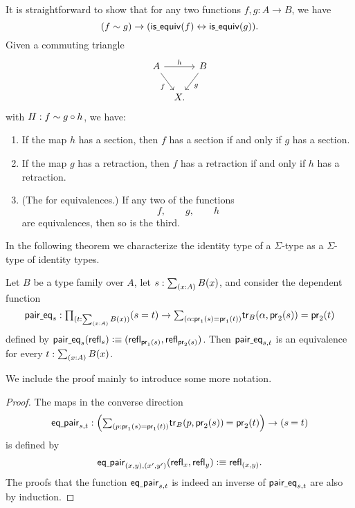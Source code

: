 It is straightforward to show that for any two functions $f,g:A\to B$, we have
\begin{equation*}
(f\sim g)\to (\mathsf{is\underline{\ }{}equiv}(f)\leftrightarrow\mathsf{is\underline{\ }{}equiv}(g)).
\end{equation*}
Given a commuting triangle
\begin{equation*}
\begin{tikzcd}[column sep=tiny]
A \arrow[rr,"h"] \arrow[dr,swap,"f"] & & B \arrow[dl,"g"] \\
& X.
\end{tikzcd}
\end{equation*}
with $H:f\sim g\circ h$, we have:
\begin{enumerate}
\item If the map $h$ has a section, then $f$ has a section if and only if $g$ has a section.
\item If the map $g$ has a retraction, then $f$ has a retraction if and only if $h$ has a retraction.
\item (The  for equivalences.) If any two of the functions
\begin{equation*}
f,\qquad g,\qquad h
\end{equation*}
are equivalences, then so is the third.
\end{enumerate}

In the following theorem we characterize the identity type of a $\Sigma$-type as a $\Sigma$-type of identity types.


\begin{prp}\label{thm:eq_sigma}
Let $B$ be a type family over $A$, let $s:\sm{x:A}B(x)$, and consider the dependent function
\begin{equation*}
\paireq_s:\prd{t:\sm{x:A}B(x)} (s=t)\to \sm{\alpha:\proj 1(s)=\proj 1(t)} \tr_B(\alpha,\proj 2(s))=\proj 2(t)
\end{equation*}
defined by $\mathsf{pair\underline{\ }{}eq}_s(\mathsf{refl}_{s}) \vcentcolon\equiv (\mathsf{refl}_{\mathsf{pr}_{1}(s)},\mathsf{refl}_{\mathsf{pr}_{2}(s)})$. Then $\mathsf{pair\underline{\ }{}eq}_{s,t}$ is an equivalence for every $t:\sm{x:A}B(x)$.
\end{prp}

We include the proof mainly to introduce some more notation.

\begin{proof}
The maps in the converse direction
\begin{equation*}
\eqpair_{s,t} : \Big(\sm{p:\proj 1(s)=\proj 1(t)}\id{\tr_B(p,\proj 2(s))}{\proj 2(t)}\Big)\to(\id{s}{t})
\end{equation*}
is defined by
\begin{equation*}
\mathsf{eq\underline{\ }{}pair}_{(x,y),(x',y')}(\mathsf{refl}_{x},\mathsf{refl}_{y})\vcentcolon\equiv \mathsf{refl}_{(x,y)}.
\end{equation*}
The proofs that the function $\mathsf{eq\underline{\ }{}pair}_{s,t}$ is indeed an inverse of $\mathsf{pair\underline{\ }{}eq}_{s,t}$ are also by induction.
\end{proof}

